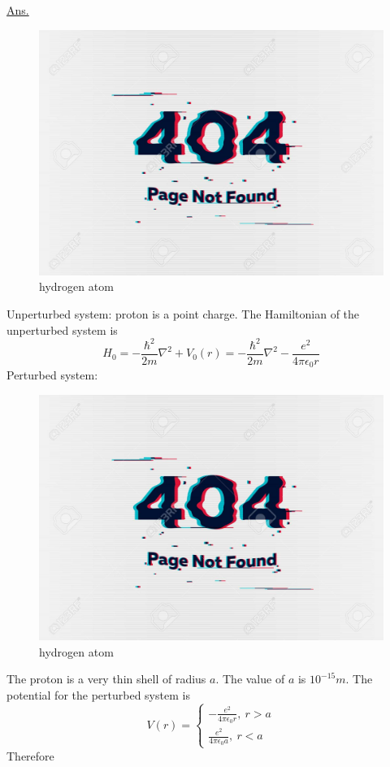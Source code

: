 \begin{enumerate}[label=Problem.\arabic*,start=1]
			\underline{Ans.}
			\begin{figure}
				\centering
				\includegraphics[width=0.5\linewidth]{Pictures/not-found.jpg}
				\caption{hydrogen atom}
			\end{figure}
			Unperturbed system: proton is a point charge. The Hamiltonian  of the unperturbed system is
			\begin{equation}
				H_0 = - \frac{\hbar^2}{2 m} \nabla^2 + V_0(r) = - \frac{\hbar^2}{2 m} \nabla^2 - \frac{e^2}{4 \pi \epsilon_0 r}
			\end{equation}
			Perturbed system:
			
			\begin{figure}
				\centering
				\includegraphics[width=0.5\linewidth]{Pictures/not-found.jpg}
				\caption{hydrogen atom}
			\end{figure}
		The proton is a very thin shell of radius $a$. The value of $a$ is $10^{-15}m$. The potential for the perturbed system is
		\begin{equation}
			V(r) = \begin{cases}
			-\frac{e^2}{4 \pi \epsilon_0 r},\ r > a \\
			\frac{e^2}{4 \pi \epsilon_0 a}, \ r < a
			\end{cases}
		\end{equation}
			Therefore
			

\end{enumerate}
